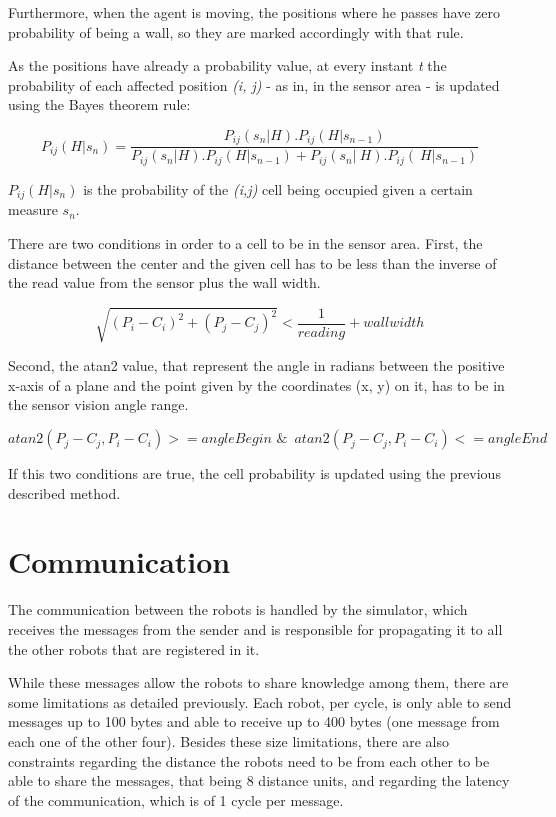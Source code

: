 \documentclass[oribibl]{llncs}
\begin{document}
Furthermore, when the agent is moving, the positions where he passes have zero probability of being a wall, so they are marked accordingly with that rule. 

As the positions have already a probability value, at every instant \emph{t} the probability of each affected position \emph{(i, j)} - as in, in the sensor area - is updated using the Bayes theorem rule:

 \begin{equation}
     P_{ij}(H|s_n) =   \dfrac{P_{ij}(s_n|H). P_{ij}(H|s_{n-1})}{P_{ij}(s_n|H).P_{ij}(H|s_{n-1})+ P_{ij}(s_n|~H).P_{ij}(~H|s_{n-1})}
\end{equation}

 $P_{ij}(H|s_n)$ is the probability of the \emph{(i,j)} cell being occupied given a certain measure $s_n$.

There are two conditions in order to a cell to be in the sensor area. First, the distance between the center and the given cell has to be less than the inverse of the read value from the sensor plus the wall width. 

 \begin{equation}
    \sqrt{(P_i-C_i)^2 + (P_j-C_j)^2} < \dfrac{1}{reading} + wall width
\end{equation}

Second, the atan2 value, that represent the angle in radians between the positive x-axis of a plane and the point given by the coordinates (x, y) on it, has to be in the sensor vision angle range.

 \begin{equation}
    atan2(P_j-C_j, P_i-C_i) >= angleBegin \,\,\&\,\,\,  atan2(P_j-C_j, P_i-C_i) <= angleEnd 
\end{equation}

If this two conditions are true, the cell probability is updated using the previous described method.

\section{Communication}
\label{communication}

The communication between the robots is handled by the simulator, which receives the messages from the sender and is responsible for propagating it to all the other robots that are registered in it. 

While these messages allow the robots to share knowledge among them, there are some limitations as detailed previously. Each robot, per cycle, is only able to send messages up to 100 bytes and able to receive up to 400 bytes (one message from each one of the other four). Besides these size limitations, there are also constraints regarding the distance the robots need to be from each other to be able to share the messages, that being 8 distance units, and regarding the latency of the communication, which is of 1 cycle per message.
\end{document}
